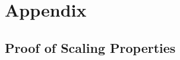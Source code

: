 \documentclass[a4paper,11pt]{article}
\theoremstyle{plain}
\newtheorem{theorem}{Theorem}[section]
\theoremstyle{definition}
\begin{document}
\section{Appendix}

\subsection{Proof of Scaling Properties}\label{proofs:scaling}
\end{document}
